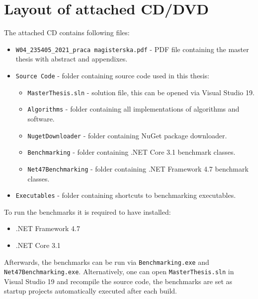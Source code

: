 \chapter{Layout of attached CD/DVD}

The attached CD contains following files:
\begin{itemize}
	\item \texttt{W04\_235405\_2021\_praca magisterska.pdf} - PDF file containing the master thesis with abstract and appendixes.
	\item \texttt{Source Code} - folder containing source code used in this thesis:
	\begin{itemize}
		\item \texttt{MasterThesis.sln} - solution file, this can be opened via Visual Studio 19.
		\item \texttt{Algorithms} - folder containing all implementations of algorithms and software.
		\item \texttt{NugetDownloader} - folder containing NuGet package downloader.
		\item \texttt{Benchmarking} - folder containing .NET Core 3.1 benchmark classes.
		\item \texttt{Net47Benchmarking} - folder containing .NET Framework 4.7 benchmark classes.
	\end{itemize}
	\item \texttt{Executables} - folder containing shortcuts to benchmarking executables.
\end{itemize}

To run the benchmarks it is required to have installed:
\begin{itemize}
	\item .NET Framework 4.7
	\item .NET Core 3.1
\end{itemize}

Afterwards, the benchmarks can be run via \texttt{Benchmarking.exe} and \texttt{Net47Benchmarking.exe}.
Alternatively, one can open \texttt{MasterThesis.sln} in Visual Studio 19 and recompile the source code,
the benchmarks are set as startup projects automatically executed after each build.
